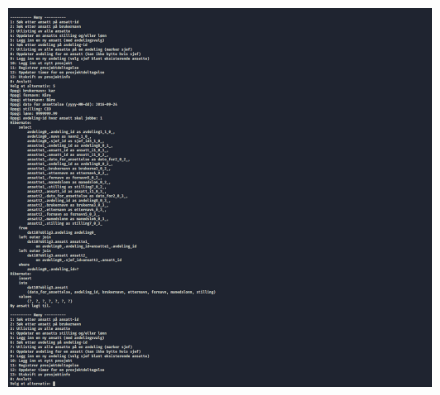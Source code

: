 \documentclass[12pt]{article}
\begin{document}
\begin{figure}[ht]
    \centering
    \includegraphics[width=1\textwidth]{./img/Running3.PNG}
\end{figure}
\end{document}
